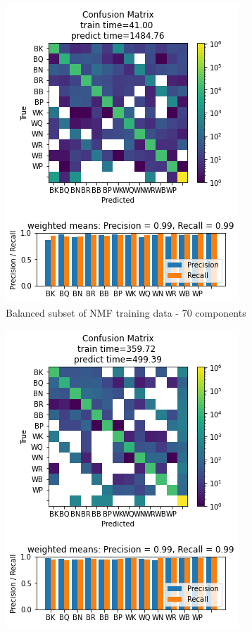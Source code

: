 \documentclass{article}
\newcommand{\NMFBL}{Balanced subset of NMF training data - 70 components}
\begin{document}
\begin{figure}[h]
\begin{subfigure}{0.33\textwidth}
\includegraphics[width=0.9\linewidth]{LR_B_NMF70c_160x160_evaluation.png} 
\caption{\NMFBL}
\end{subfigure}
\begin{subfigure}{0.33\textwidth}
\includegraphics[width=0.9\linewidth]{LR_PCA50c_160x160_evaluation.png}

\end{subfigure}
\end{figure}
\end{document}
